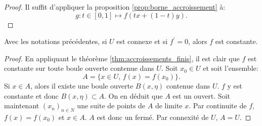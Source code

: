 \begin{proof}
Il suffit d'appliquer la proposition \ref{prop:borne_accroissement} à:
\begin{equation}
  g \colon t \in [0,1] \mapsto f(t x + (1-t)y).
\end{equation}
\end{proof}
\begin{fcor}
  Avec les notations précédentes, si $U$ est connexe et si $f^\prime=0$, alors $f$ est constante.
\end{fcor}
\begin{proof}
En appliquant le théorème \ref{thm:accroissements_finis}, il est clair que $f$ est constante sur toute boule ouverte contenue dans $U.$
Soit $x_0 \in U$ et soit l'ensemble:
\begin{equation}
  A = \{ x \in U, \, f(x) = f(x_0) \}.
\end{equation}
Si $x \in A$, alors il existe une boule ouverte $B(x,\eta)$ contenue dans $U$. $f$ y est constante et donc $B(x,\eta) \subset A.$ On
en déduit que $A$ est un ouvert. Soit maintenant $(x_n)_{n \in N}$ une suite de points de $A$ de limite $x.$ Par continuite de $f$,
$f(x) = f(x_0)$  et $x \in A$. $A$ est donc un fermé. Par connexité de $U$, $A=U.$
\end{proof}
%
